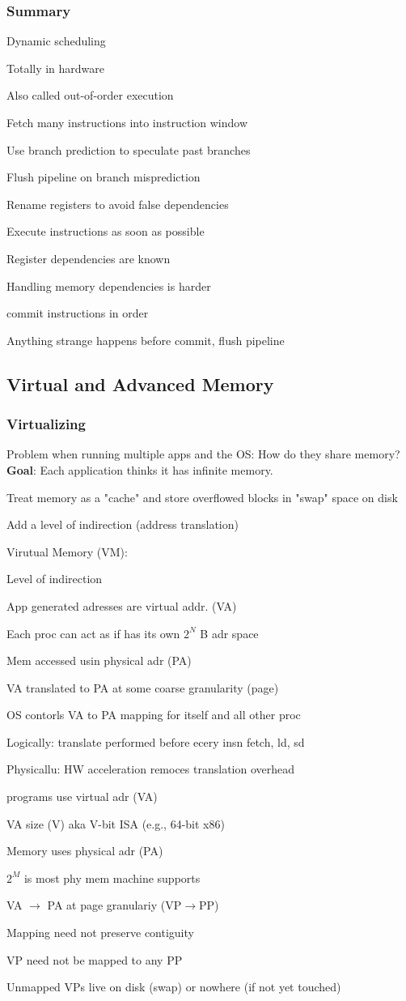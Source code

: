 \documentclass[a4paper, fontsize=8pt, landscape, DIV=1]{scrartcl}
\makeatletter
\renewenvironment{outline}[1][]{%
  \ifthenelse{\equal{#1}{}}{}{\renewcommand{\ol@type}{#1}}%
  \ol@z%
  \newcommand{\0}{\ol@toz\ol@z}%
  \newcommand{\1}{\vspace{\dimexpr\outlinespacingscalar\baselineskip-\baselineskip}\ol@toi\ol@i\item}%
  \newcommand{\2}{\vspace{\dimexpr\outlinespacingscalartwo\baselineskip-\baselineskip}\ol@toii\ol@ii\item}%
  \newcommand{\3}{\vspace{\dimexpr\outlinespacingscalar\baselineskip-\baselineskip}\ol@toiii\ol@iii\item}%
  \newcommand{\4}{\vspace{\dimexpr\outlinespacingscalar\baselineskip-\baselineskip}\ol@toiiii\ol@iiii\item}%
}{%
  \ol@toz\ol@exit%
}
\def\outlinespacingscalar{0.5}
\def\outlinespacingscalartwo{0.5}
\makeatother
\begin{document}
\begin{multicols*}{4}
\begin{outline}
  \end{outline}

  \subsubsection{Summary}
  \begin{outline}
    \1 Dynamic scheduling
      \2 Totally in hardware
      \2 Also called out-of-order execution
    \1 Fetch many instructions into instruction window
      \2 Use branch prediction to speculate past branches
      \2 Flush pipeline on branch misprediction
    \1 Rename registers to avoid false dependencies
    \1 Execute instructions as soon as possible
      \2 Register dependencies are known
      \2 Handling memory dependencies is harder
    \1 commit instructions in order
      \2 Anything strange happens before commit, flush pipeline
  \end{outline}

  \subsection{Virtual and Advanced Memory}

  \subsubsection{Virtualizing}
  Problem when running multiple apps and the OS: How do they share memory?
  \textbf{Goal}: Each application thinks it has infinite memory. 
  \begin{outline}
    \1 Treat memory as a "cache" and store overflowed blocks in "swap" space on disk
    \1 Add a level of indirection (address translation)
  \end{outline}

  Virutual Memory (VM):
  \begin{outline}
    \1 Level of indirection
    \1 App generated adresses are virtual addr. (VA)
      \2 Each proc can act as if has its own $2^N$ B adr space
    \1 Mem accessed usin physical adr (PA)
    \1 VA translated to PA at some coarse granularity (page)
    \1 OS contorls VA to PA mapping for itself and all other proc
    \1 Logically: translate performed before ecery insn fetch, ld, sd
    \1 Physicallu: HW acceleration remoces translation overhead
  \end{outline}

  \begin{outline}
    \1 programs use virtual adr (VA)
      \2 VA size (V) aka V-bit ISA (e.g., 64-bit x86)
    \1 Memory uses physical adr (PA)
      \2 $2^M$ is most phy mem machine supports
    \1 VA $\to$ PA at page granulariy (VP$\to$PP)
      \2 Mapping need not preserve contiguity
      \2 VP need not be mapped to any PP
      \2 Unmapped VPs live on disk (swap) or nowhere (if not yet touched)
  \end{outline}


\end{multicols*}
\end{document}
